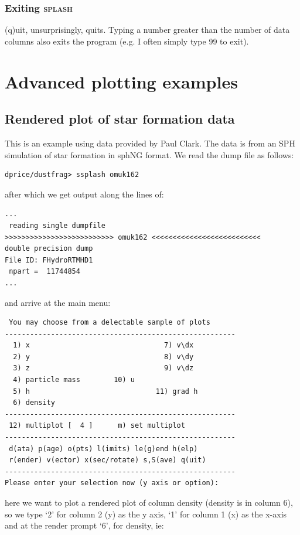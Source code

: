 \documentclass[a4paper,10pt]{article}
\newcommand{\splash}{\textsc{splash }}
\begin{document}
\subsubsection{ Exiting \splash}
 (q)uit, unsurprisingly, quits. Typing a number greater than the number of
data columns also exits the program (e.g. I often simply type 99 to exit).

\section{Advanced plotting examples}%

\subsection{Rendered plot of star formation data}
 This is an example using data provided by Paul Clark. The data is from an SPH simulation of star formation in sphNG format. We read the dump file as follows:
\begin{verbatim}
dprice/dustfrag> ssplash omuk162
\end{verbatim}
after which we get output along the lines of:
\begin{verbatim}
...
 reading single dumpfile
>>>>>>>>>>>>>>>>>>>>>>>>>> omuk162 <<<<<<<<<<<<<<<<<<<<<<<<<<
double precision dump
File ID: FHydroRTMHD1
 npart =  11744854
...
\end{verbatim}
and arrive at the main menu:
\begin{verbatim}
 You may choose from a delectable sample of plots 
-------------------------------------------------------
  1) x                                7) v\dx                
  2) y                                8) v\dy                
  3) z                                9) v\dz                
  4) particle mass        10) u                   
  5) h                              11) grad h              
  6) density             
-------------------------------------------------------
 12) multiplot [  4 ]      m) set multiplot 
-------------------------------------------------------
 d(ata) p(age) o(pts) l(imits) le(g)end h(elp)
 r(ender) v(ector) x(sec/rotate) s,S(ave) q(uit)
-------------------------------------------------------
Please enter your selection now (y axis or option):
\end{verbatim}
here we want to plot a rendered plot of column density (density is in column 6), so we type `2' for column 2 (y) as the y axis, `1' for column 1 (x) as the x-axis and at the render prompt `6', for density, ie:
\end{document}
